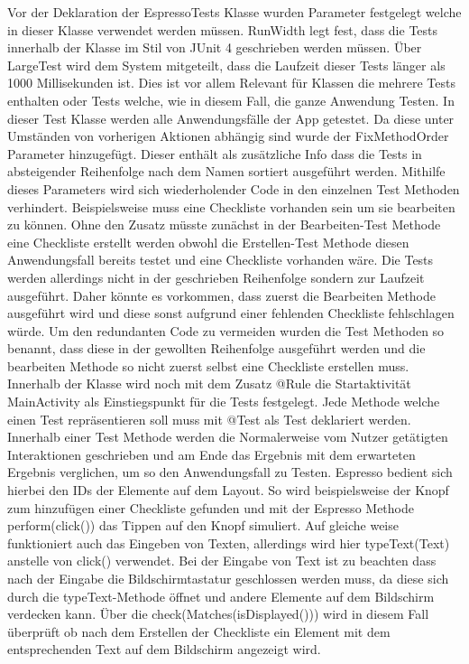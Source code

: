 Vor der Deklaration der EspressoTests Klasse wurden Parameter festgelegt welche in dieser Klasse verwendet werden müssen. RunWidth legt fest, dass die Tests innerhalb der Klasse im Stil von JUnit 4 geschrieben werden müssen. Über LargeTest wird dem System mitgeteilt, dass die Laufzeit dieser Tests länger als 1000 Millisekunden ist. Dies ist vor allem Relevant für Klassen die mehrere Tests enthalten oder Tests welche, wie in diesem Fall, die ganze Anwendung Testen. In dieser Test Klasse werden alle Anwendungsfälle der App getestet. Da diese unter Umständen von vorherigen Aktionen abhängig sind wurde der FixMethodOrder Parameter hinzugefügt. Dieser enthält als zusätzliche Info dass die Tests in absteigender Reihenfolge nach dem Namen sortiert ausgeführt werden. Mithilfe dieses Parameters wird sich wiederholender Code in den einzelnen Test Methoden verhindert. Beispielsweise muss eine Checkliste vorhanden sein um sie bearbeiten zu können. Ohne den Zusatz müsste zunächst in der Bearbeiten-Test Methode eine Checkliste erstellt werden obwohl die Erstellen-Test Methode diesen Anwendungsfall bereits testet und eine Checkliste vorhanden wäre. Die Tests werden allerdings nicht in der geschrieben Reihenfolge sondern zur Laufzeit ausgeführt. Daher könnte es vorkommen, dass zuerst die Bearbeiten Methode ausgeführt wird und diese sonst aufgrund einer fehlenden Checkliste fehlschlagen würde. Um den redundanten Code zu vermeiden wurden die Test Methoden so benannt, dass diese in der gewollten Reihenfolge ausgeführt werden und die bearbeiten Methode so nicht zuerst selbst eine Checkliste erstellen muss.\\
Innerhalb der Klasse wird noch mit dem Zusatz @Rule die Startaktivität MainActivity als Einstiegspunkt für die Tests festgelegt. Jede Methode welche einen Test repräsentieren soll muss mit @Test als Test deklariert werden. Innerhalb einer Test Methode werden die Normalerweise vom Nutzer getätigten Interaktionen geschrieben und am Ende das Ergebnis mit dem erwarteten Ergebnis verglichen, um so den Anwendungsfall zu Testen. Espresso bedient sich hierbei den IDs der Elemente auf dem Layout. So wird beispielsweise der Knopf zum hinzufügen einer Checkliste gefunden und mit der Espresso Methode perform(click()) das Tippen auf den Knopf simuliert. Auf gleiche weise funktioniert auch das Eingeben von Texten, allerdings wird hier typeText(\grqq Text\grqq{}) anstelle von click() verwendet. Bei der Eingabe von Text ist zu beachten dass nach der Eingabe die Bildschirmtastatur geschlossen werden muss, da diese sich durch die typeText-Methode öffnet und andere Elemente auf dem Bildschirm verdecken kann. Über die check(Matches(isDisplayed())) wird in diesem Fall überprüft ob nach dem Erstellen der Checkliste ein Element mit dem entsprechenden Text auf dem Bildschirm angezeigt wird.\\
